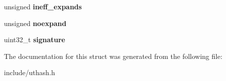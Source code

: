 \begin{DoxyCompactItemize}
\item 
\hypertarget{struct_u_t__hash__table_a216c7d98cf40a0064bee94aa8a5bf1b7}{unsigned {\bfseries ineff\+\_\+expands}}\label{struct_u_t__hash__table_a216c7d98cf40a0064bee94aa8a5bf1b7}

\item 
\hypertarget{struct_u_t__hash__table_a635661789933752e7b83dac84430eae1}{unsigned {\bfseries noexpand}}\label{struct_u_t__hash__table_a635661789933752e7b83dac84430eae1}

\item 
\hypertarget{struct_u_t__hash__table_a87d1ab3f3ede1809c6a485972d20b25f}{uint32\+\_\+t {\bfseries signature}}\label{struct_u_t__hash__table_a87d1ab3f3ede1809c6a485972d20b25f}

\end{DoxyCompactItemize}


The documentation for this struct was generated from the following file\+:\begin{DoxyCompactItemize}
\item 
include/uthash.\+h\end{DoxyCompactItemize}
